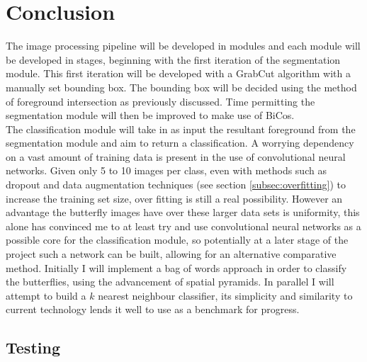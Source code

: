 \documentclass[11pt, titlepage, oneside]{article}
\theoremstyle{plain}
\theoremstyle{definition}
\theoremstyle{remark}
\begin{document}
			


	\section{Conclusion}
		The image processing pipeline will be developed in modules and each module will be developed in stages, beginning with the first iteration of the segmentation module. This first iteration will be developed with a GrabCut algorithm with a manually set bounding box. The bounding box will be decided using the method of foreground intersection as previously discussed. Time permitting the segmentation module will then be improved to make use of BiCos.\\
		
		\noindent The classification module will take in as input the resultant foreground from the segmentation module and aim to return a classification. A worrying dependency on a vast amount of training data is present in the use of convolutional neural networks. Given only 5 to 10 images per class, even with methods such as dropout\cite{dropout} and data augmentation techniques (see section \ref{subsec:overfitting}) to increase the training set size\cite{zoo}, over fitting is still a real possibility. However an advantage the butterfly images have over these larger data sets is uniformity, this alone has convinced me to at least try and use convolutional neural networks as a possible core for the classification module, so potentially at a later stage of the project such a network can be built, allowing for an alternative comparative method. Initially I will implement a bag of words approach in order to classify the butterflies, using the advancement of spatial pyramids. In parallel I will attempt to build a $k$ nearest neighbour classifier, its simplicity and similarity to current technology\cite{DAISY} lends it well to use as a benchmark for progress.\\
		\subsection{Testing}
\end{document}
